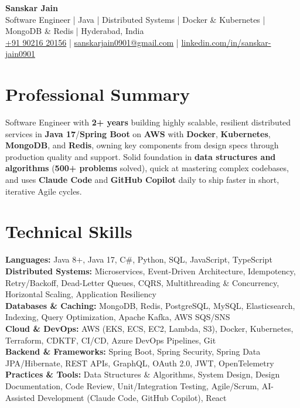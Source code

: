 \documentclass[a4paper,10pt]{article}
\begin{document}
\begin{center}
    {\LARGE \textbf{Sanskar Jain}} \\
    \vspace{2pt}
    Software Engineer \;|\; Java \;|\; Distributed Systems \;|\; Docker \& Kubernetes \;|\; MongoDB \& Redis \;|\; Hyderabad, India \\
    \vspace{2pt}
    \href{tel:+919021620156}{+91 90216 20156} \;|\;
    \href{mailto:sanskarjain0901@gmail.com}{sanskarjain0901@gmail.com} \;|\;
    \href{https://www.linkedin.com/in/sanskar-jain0901/}{linkedin.com/in/sanskar-jain0901}
\end{center}

\section*{Professional Summary}
Software Engineer with \textbf{2+ years} building highly scalable, resilient distributed services in \textbf{Java 17}/\textbf{Spring Boot} on \textbf{AWS} with \textbf{Docker}, \textbf{Kubernetes}, \textbf{MongoDB}, and \textbf{Redis}, owning key components from design specs through production quality and support.
Solid foundation in \textbf{data structures and algorithms} (\textbf{500+ problems} solved), quick at mastering complex codebases, and uses \textbf{Claude Code} and \textbf{GitHub Copilot} daily to ship faster in short, iterative Agile cycles.

\section*{Technical Skills}
\begin{sloppypar}
\noindent
\textbf{Languages:} Java 8+, Java 17, C\#, Python, SQL, JavaScript, TypeScript \\
\textbf{Distributed Systems:} Microservices, Event-Driven Architecture, Idempotency, Retry/Backoff, Dead-Letter Queues, CQRS, Multithreading \& Concurrency, Horizontal Scaling, Application Resiliency \\
\textbf{Databases \& Caching:} MongoDB, Redis, PostgreSQL, MySQL, Elasticsearch, Indexing, Query Optimization, Apache Kafka, AWS SQS/SNS \\
\textbf{Cloud \& DevOps:} AWS (EKS, ECS, EC2, Lambda, S3), Docker, Kubernetes, Terraform, CDKTF, CI/CD, Azure DevOps Pipelines, Git \\
\textbf{Backend \& Frameworks:} Spring Boot, Spring Security, Spring Data JPA/Hibernate, REST APIs, GraphQL, OAuth 2.0, JWT, OpenTelemetry \\
\textbf{Practices \& Tools:} Data Structures \& Algorithms, System Design, Design Documentation, Code Review, Unit/Integration Testing, Agile/Scrum, AI-Assisted Development (Claude Code, GitHub Copilot), React
\end{sloppypar}
\end{document}
